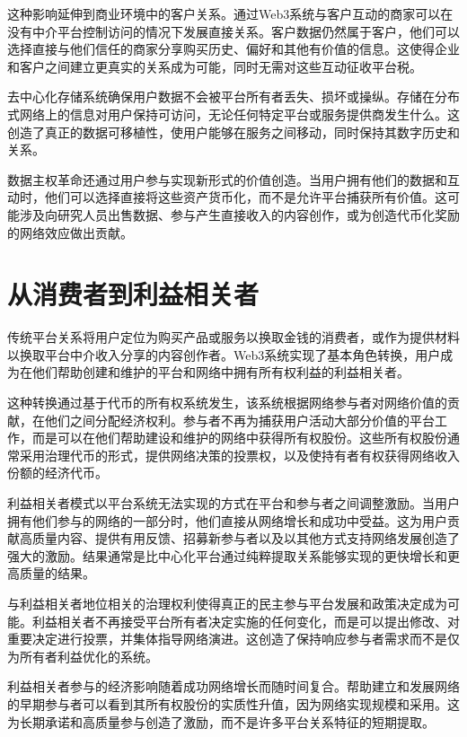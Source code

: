 \documentclass[
  Letterpaper,
]{scrbook}
\begin{document}
这种影响延伸到商业环境中的客户关系。通过Web3系统与客户互动的商家可以在没有中介平台控制访问的情况下发展直接关系。客户数据仍然属于客户，他们可以选择直接与他们信任的商家分享购买历史、偏好和其他有价值的信息。这使得企业和客户之间建立更真实的关系成为可能，同时无需对这些互动征收平台税。

去中心化存储系统确保用户数据不会被平台所有者丢失、损坏或操纵。存储在分布式网络上的信息对用户保持可访问，无论任何特定平台或服务提供商发生什么。这创造了真正的数据可移植性，使用户能够在服务之间移动，同时保持其数字历史和关系。

数据主权革命还通过用户参与实现新形式的价值创造。当用户拥有他们的数据和互动时，他们可以选择直接将这些资产货币化，而不是允许平台捕获所有价值。这可能涉及向研究人员出售数据、参与产生直接收入的内容创作，或为创造代币化奖励的网络效应做出贡献。

\section{从消费者到利益相关者}\label{ux4eceux6d88ux8d39ux8005ux5230ux5229ux76caux76f8ux5173ux8005}

传统平台关系将用户定位为购买产品或服务以换取金钱的消费者，或作为提供材料以换取平台中介收入分享的内容创作者。Web3系统实现了基本角色转换，用户成为在他们帮助创建和维护的平台和网络中拥有所有权利益的利益相关者。

这种转换通过基于代币的所有权系统发生，该系统根据网络参与者对网络价值的贡献，在他们之间分配经济权利。参与者不再为捕获用户活动大部分价值的平台工作，而是可以在他们帮助建设和维护的网络中获得所有权股份。这些所有权股份通常采用治理代币的形式，提供网络决策的投票权，以及使持有者有权获得网络收入份额的经济代币。

利益相关者模式以平台系统无法实现的方式在平台和参与者之间调整激励。当用户拥有他们参与的网络的一部分时，他们直接从网络增长和成功中受益。这为用户贡献高质量内容、提供有用反馈、招募新参与者以及以其他方式支持网络发展创造了强大的激励。结果通常是比中心化平台通过纯粹提取关系能够实现的更快增长和更高质量的结果。

与利益相关者地位相关的治理权利使得真正的民主参与平台发展和政策决定成为可能。利益相关者不再接受平台所有者决定实施的任何变化，而是可以提出修改、对重要决定进行投票，并集体指导网络演进。这创造了保持响应参与者需求而不是仅为所有者利益优化的系统。

利益相关者参与的经济影响随着成功网络增长而随时间复合。帮助建立和发展网络的早期参与者可以看到其所有权股份的实质性升值，因为网络实现规模和采用。这为长期承诺和高质量参与创造了激励，而不是许多平台关系特征的短期提取。
\end{document}

